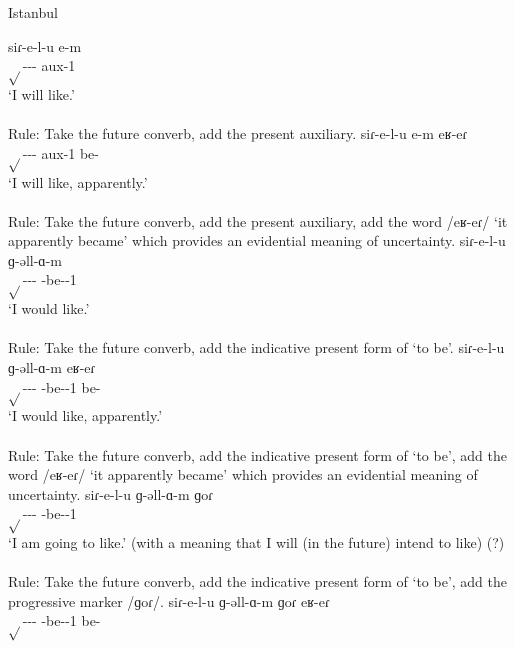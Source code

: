 \begin{exe}
	\ex Istanbul \label{sent:Istanbul:morpho:verb:complex:futcvb:pres}
	\begin{xlist}
		\ex \gll siɾ-e-l-u e-m \\
		$\sqrt{}$-{\thgloss}-{\infgloss}-{\futcvb} {aux}-1{\sg} \\
		\trans `I will like.' \\
		 \\
		Rule: Take the future converb, add the present auxiliary.
		\ex \gll siɾ-e-l-u e-m eʁ-eɾ \\
		$\sqrt{}$-{\thgloss}-{\infgloss}-{\futcvb} {aux}-1{\sg} be-{\eptcp} \\
		\trans `I will like, apparently.' \\
		 \\
		Rule: Take the future converb, add the present auxiliary, add the word /eʁ-eɾ/ `it apparently became' which provides an evidential meaning of uncertainty.
		\ex \gll siɾ-e-l-u ɡ-əll-ɑ-m \\
		$\sqrt{}$-{\thgloss}-{\infgloss}-{\futcvb} {\ind}-be-{\thgloss}-1{\sg} \\
		\trans `I would like.' \\
		 \\
		Rule: Take the future converb, add the indicative present form of `to be'.
		\ex \gll siɾ-e-l-u ɡ-əll-ɑ-m eʁ-eɾ \\
		$\sqrt{}$-{\thgloss}-{\infgloss}-{\futcvb} {\ind}-be-{\thgloss}-1{\sg} be-{\eptcp} \\
		\trans `I would like, apparently.' \\
		 \\
		Rule: Take the future converb, add the indicative present form of `to be', add the word /eʁ-eɾ/ `it apparently became' which provides an evidential meaning of uncertainty.
		\ex \gll siɾ-e-l-u ɡ-əll-ɑ-m ɡoɾ \\
		$\sqrt{}$-{\thgloss}-{\infgloss}-{\futcvb} {\ind}-be-{\thgloss}-1{\sg} {\prog} \\
		\trans `I am going to like.' (with a meaning that I will (in the future) intend to like) (?) \\
		 \\
		Rule: Take the future converb, add the indicative present form of `to be', add the progressive marker /ɡoɾ/. 
		\ex \gll siɾ-e-l-u ɡ-əll-ɑ-m ɡoɾ eʁ-eɾ \\
		$\sqrt{}$-{\thgloss}-{\infgloss}-{\futcvb} {\ind}-be-{\thgloss}-1{\sg} {\prog} be-{\eptcp} \\

\end{xlist}
\end{exe}
